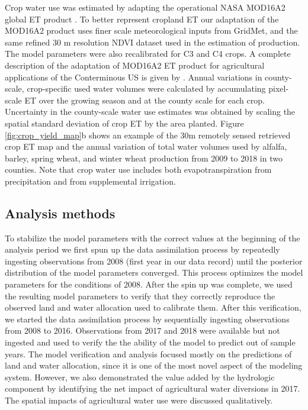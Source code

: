 Crop water use was estimated by adapting the operational NASA MOD16A2 global ET product \citep{Mu2011}. To better represent cropland ET our adaptation of the MOD16A2 product uses finer scale meteorological inputs from GridMet, and the same refined 30 m resolution NDVI dataset used in the estimation of production. The model parameters were also recalibrated for C3 and C4 crops. A complete description of the adaptation of MOD16A2 ET product for agricultural applications of the Conterminous US is given by \citet{He2019}. Annual variations in county-scale, crop-specific used water volumes were calculated by accumulating pixel-scale ET over the growing season and at the county scale for each crop. Uncertainty in the county-scale water use estimates was obtained by scaling the spatial standard deviation of crop ET by the area planted. Figure \ref{fig:crop_yield_map}b shows an example of the 30m remotely sensed retrieved crop ET map and the annual variation of total water volumes used by alfalfa, barley, spring wheat, and winter wheat production from 2009 to 2018 in two counties. Note that crop water use includes both evapotranspiration from precipitation and from supplemental irrigation. 

\subsection{Analysis methods}

To stabilize the model parameters with the correct values at the beginning of the analysis period we first spun up the data assimilation process by repeatedly ingesting observations from 2008 (first year in our data record) until the posterior distribution of the model parameters converged. This process optimizes the model parameters for the conditions of 2008. After the spin up was complete, we used the resulting model parameters to verify that they correctly reproduce the observed land and water allocation used to calibrate them. After this verification, we started the data assimilation process by sequentially ingesting observations from 2008 to 2016. Observations from 2017 and 2018 were available but not ingested and used to verify the the ability of the model to predict out of sample years. The model verification and analysis focused mostly on the predictions of land and water allocation, since it is one of the most novel aspect of the modeling system. However, we also demonstrated the value added by the hydrologic component by identifying the net impact of agricultural water diversions in 2017. The spatial impacts of agricultural water use were discussed qualitatively.     


